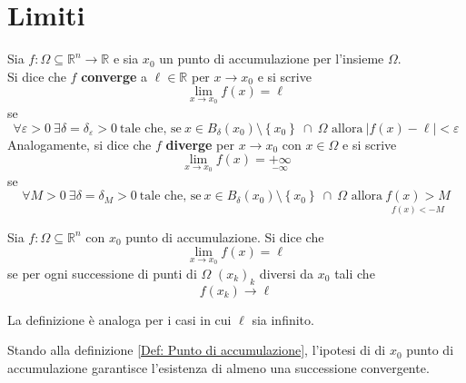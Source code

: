 \section{Limiti}
\begin{definition} \label{Def: Limiti al finito}
    Sia $f:\Omega \subseteq \mathbb{R}^n \to \mathbb{R}$ e sia $x_0$ un punto di accumulazione per l'insieme $\Omega$.\\
    Si dice che $f$ \textbf{converge} a $\ell \in \mathbb{R}$ per $x \to x_0$ e si scrive
    \begin{equation}
        \lim_{x \to x_0}{f(x)}=\ell
    \end{equation} 
    se
    \begin{equation}
        \forall \varepsilon>0 \ \exists\delta=\delta_\varepsilon>0\ \text{tale che, se}\ 
                x \in B_\delta(x_0) \setminus \left\{x_0\right\}\ \cap\ \Omega
            \text{ allora}\ |f(x)-\ell|<\varepsilon
    \end{equation}
    Analogamente, si dice che $f$ \textbf{diverge} per $x \to x_0$ con $x \in \Omega$ e si scrive
    \begin{equation}
        \lim_{x \to x_0}{f(x)}=\underset{-\infty}{+\infty}
    \end{equation}
    se 
    \begin{equation}
        \forall M>0 \ \exists\delta=\delta_M>0\ \text{tale che, se}\ 
        x \in B_\delta(x_0) \setminus \left\{x_0\right\}\ \cap\ \Omega
            \text{ allora}\ \underset{f(x)<-M}{f(x)>M}
    \end{equation}
\end{definition}
\begin{definition}
    Sia $f:\Omega \subseteq \mathbb{R}^n$ con $x_0$ punto di accumulazione. Si dice che 
    \begin{equation}
        \lim_{x \to x_0}{f(x)}=\ell
    \end{equation}
    se per ogni successione di punti di $\Omega$ $(x_k)_k$ diversi da $x_0$ tali che
    \begin{equation}
        f(x_k)\to \ell
    \end{equation}
    \end{definition}
    \begin{oss}
        La definizione è analoga per i casi in cui $\ell$ sia infinito.
    \end{oss}
    \begin{oss}
        Stando alla definizione \ref{Def: Punto di accumulazione}, l'ipotesi di di $x_0$ punto di accumulazione garantisce l'esistenza di almeno una successione convergente.
    \end{oss}
